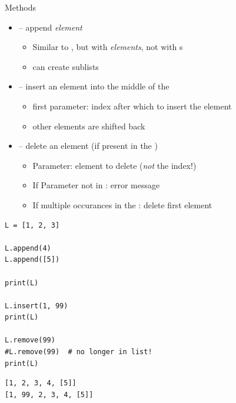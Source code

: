 
\begin{frame}[fragile]
%
\begin{minipage}{.49\linewidth}
\begin{Large}
Methods
\vspace{6pt}
\end{Large}
\begin{itemize}
\item {} -- append \emph{element}
	\begin{itemize}
	\item Similar to \inPy{+=}, but with \emph{elements}, not with s
	\item can create sublists
	\end{itemize}
\item {} -- insert an element into the middle of the 
	\begin{itemize}
	\item first parameter: index after which to insert the element
	\item other elements are shifted back
	\end{itemize}
\item {} -- delete an element (if present in the )
	\begin{itemize}
	\item Parameter: element to delete (\emph{not} the index!)
	\item If Parameter not in : error message
	\item If multiple occurances in the : delete first element
	\end{itemize}
\end{itemize}
\end{minipage}
%
\begin{minipage}{.49\linewidth}
\phantom{x}
\begin{codebox}
\begin{verbatim}
L = [1, 2, 3]

L.append(4)
L.append([5])

print(L)

L.insert(1, 99)
print(L)

L.remove(99)
#L.remove(99)  # no longer in list!
print(L)
\end{verbatim}
\end{codebox}
%
\begin{cmdbox}
\begin{verbatim}
[1, 2, 3, 4, [5]]
[1, 99, 2, 3, 4, [5]]
\end{verbatim}
\end{cmdbox}
\end{minipage}
%
\end{frame}

